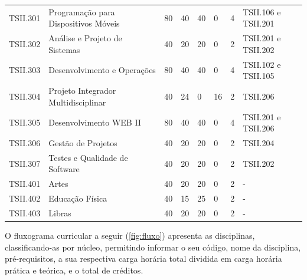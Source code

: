 \documentclass[
	12pt,				%
	openright,			%
	twoside,			%
	a4paper,			%
	chapter=TITLE,		%
	english,			%
	french,				%
	spanish,			%
	brazil,				%
	]{abntex2}
\begin{document}
\begin{quadro}[h]
{\begin{tabular}{p{1.2cm}p{4.2cm} p{1cm} p{1.2cm} p{1.3cm} p{.8cm} p{1cm} p{1.6cm}}
\rowcolor[HTML]{EFEFEF} 
TSII.301 & Programação para  \newline Dispositivos Móveis    & 80 & 40 & 40 & 0  & 4 & TSII.106 e TSII.201 \\
TSII.302 & Análise e Projeto  \newline de Sistemas           & 40 & 20 & 20 & 0  & 2 & TSII.201 e TSII.202 \\
\rowcolor[HTML]{EFEFEF} 
TSII.303 & Desenvolvimento e  \newline Operações             & 80 & 40 & 40 & 0  & 4 & TSII.102 e TSII.105 \\
TSII.304 & Projeto Integrador  \newline Multidisciplinar     & 40 & 24 & 0  & 16 & 2 & TSII.206            \\
\rowcolor[HTML]{EFEFEF} 
TSII.305 & Desenvolvimento WEB II                  & 80 & 40 & 40 & 0  & 4 & TSII.201 e TSII.206 \\
TSII.306 & Gestão de Projetos                      & 40 & 20 & 20 & 0  & 2 & TSII.204            \\
\rowcolor[HTML]{EFEFEF} 
TSII.307 & Testes e Qualidade  \newline de Software          & 40 & 20 & 20 & 0  & 2 & TSII.202            \\ \midrule

TSII.401 & Artes          & 40 & 20 & 20 & 0  & 2 & -          \\ 
TSII.402 & Educação Física          & 40 & 15 & 25 & 0  & 2 & -            \\  
TSII.403 & Libras          & 40 & 20 & 20 & 0  & 2 & -            \\  \hline

\end{tabular}

}{
}
\end{quadro}
O fluxograma curricular a seguir (\autoref{fig:fluxo}) apresenta as disciplinas, classificando-as por núcleo, permitindo informar o seu código, nome da disciplina, pré-requisitos, a sua respectiva carga horária total dividida em carga horária prática e teórica, e o total de créditos. %

\clearpage
\newpage

\end{document}
